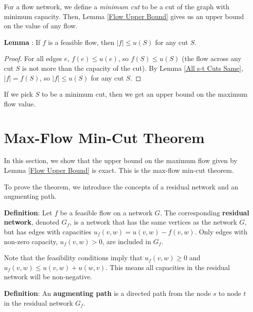 \documentclass{article}
\begin{document}
For a flow network, we define a {\em minimum cut} to be a cut of the
graph with minimum capacity.  Then, Lemma \ref{Flow Upper Bound} gives us
an upper bound on the value of any flow.

\textbf{Lemma} \label{Flow Upper Bound}:
If $f$ is a feasible flow, then $|f| \le u(S)$ for any cut $S$. 

\begin{proof}
For all edges $e$, $f(e) \le u(e)$, so $f(S) \le u(S)$ (the flow
across any cut $S$ is not more than the capacity of the cut).  By
Lemma \ref{All s-t Cuts Same}, $|f| = f(S)$, so $|f| \le u(S)$ for any cut
$S$.  
\end{proof}

If we pick $S$ to be a minimum cut, then we get an upper bound on the
maximum flow value.


\section{Max-Flow Min-Cut Theorem}
In this section, we show that the upper bound on the maximum flow
given by Lemma \ref{Flow Upper Bound} is exact.  This is the
max-flow min-cut theorem.

To prove the theorem, we introduce the concepts of a residual network
and an augmenting path.


\textbf{Definition}:
Let $f$ be a feasible flow on a network $G$. The
corresponding \textbf{residual network}, denoted $G_f$, is a network that
has the same vertices as the network $G$, but has edges with
capacities $u_f(v, w) = u(v, w) - f(v, w)$.   Only edges with
non-zero capacity, $u_f(v,w)>0$, are included in $G_f$.

Note that the feasibility conditions imply that $u_f(v,w)\ge 0$ and
$u_f(v,w)\le u(v,w)+u(w,v)$.  This means all capacities in the
residual network will be non-negative.  



\textbf{Definition}:
An \textbf{augmenting path} is a directed path from the node $s$ to node $t$
in the residual network $G_f$.
\end{document}
